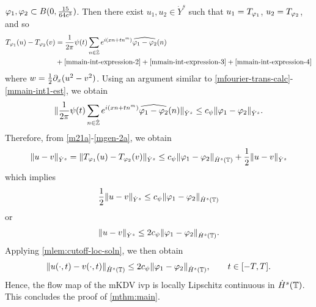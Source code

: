 $\varphi_1, \varphi_2 \subset B(0, \frac{15}{64c^{3}})$.  Then there exist $u_1, u_2 \in
\dot{Y}^s$ such that $u_1 = T_{\varphi_1}$, $u_2 = T_{\varphi_2}$, and so
%
%
\begin{equation}
	\label{mgen-1a}
	\begin{split}
		T_{\varphi_1}(u) - T_{\varphi_2}(v)
		& = \frac{1}{2\pi} \psi(t) \sum_{n \in
		\dot{\mathbb{Z}}}e^{i\left( xn + tn^m \right)} \widehat{\varphi_1 - \varphi_2}(n)
		\\
		& + \eqref{mmain-int-expression-2} + \eqref{mmain-int-expression-3} +
		\eqref{mmain-int-expression-4} 
	\end{split}
\end{equation}
%
%
where $w = \frac{1}{2} \partial_x (u^2 - v^2)$. Using an argument similar to \eqref{mfourier-trans-calc}-\eqref{mmain-int1-est},
we obtain
%
%
\begin{equation}
	\label{mgen-2a}
	\begin{split}
		\| \frac{1}{2\pi} \psi(t) \sum_{n \in
		\dot{\mathbb{Z}}}e^{i\left( xn + tn^m \right)} \widehat{\varphi_1 - \varphi_2}(n)\|_{\dot{Y}^s}
		\le c_\psi \|\varphi_{1} - \varphi_{2}\|_{\dot{Y}^s}.
	\end{split}
\end{equation}
%
%
Therefore, from \eqref{m21a}-\eqref{mgen-2a}, we obtain
%
%
\begin{equation*}
	\begin{split}
		\|u -v \|_{\dot{Y}^s} = \|T_{\varphi_1}(u) - T_{\varphi_2}(v) \|_{\dot{Y}^s} \le c_\psi
		\|\varphi_{1} - \varphi_{2} \|_{\dot{H}^s\left( \mathbb{T} \right)} +
		\frac{1}{2} \|u -v \|_{\dot{Y}^s}
	\end{split}
\end{equation*}
%
%
which implies
%
%
\begin{equation*}
	\begin{split}
		\frac{1}{2} \|u-v\|_{\dot{Y}^s} \le c_\psi \|\varphi_1 - \varphi_2 \|_{\dot{H}^s(\mathbb{T})}
	\end{split}
\end{equation*}
%
%
or
%
%
\begin{equation*}
	\begin{split}
		\|u -v \|_{\dot{Y}^s} \le 2 c_\psi \|\varphi_1 - \varphi_2 \|_{\dot{H}^s(\mathbb{T})}.
	\end{split}
\end{equation*}
%
%
Applying \cref{mlem:cutoff-loc-soln}, we then obtain
%
%
	 \begin{equation*}
		 \begin{split}
			\|u(\cdot, t) -v(\cdot, t) \|_{\dot{H}^s(\mathbb{T})} \le 2 c_\psi \|\varphi_1 -
			\varphi_2 \|_{\dot{H}^s(\mathbb{T})}, \qquad t \in [-T, T].
		 \end{split}
	 \end{equation*}
Hence, the flow map of the mKDV ivp is locally Lipschitz continuous in
$\dot{H}^s(\mathbb{T})$. This
concludes the proof of \cref{mthm:main}. \qquad \qedsymbol
%
%
%
%
